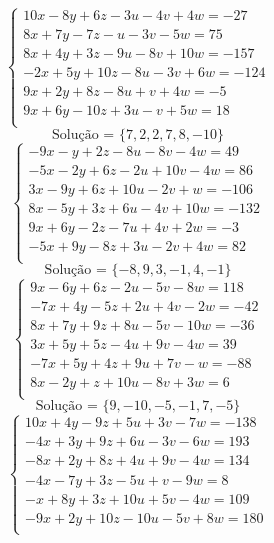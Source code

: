 \documentclass[12pt,oneside,a4paper]{article}
\begin{document}
\vspace{\baselineskip}
\begin{equation*}
\begin{cases}
10x-8y+6z-3u-4v+4w=-27 \\
8x+7y-7z-u-3v-5w=75 \\
8x+4y+3z-9u-8v+10w=-157 \\
-2x+5y+10z-8u-3v+6w=-124 \\
9x+2y+8z-8u+v+4w=-5 \\
9x+6y-10z+3u-v+5w=18 \\
\end{cases}
\end{equation*}
\begin{equation*}
\text{Solução = }\{7,2,2,7,8,-10\}
\end{equation*}
\vspace{\baselineskip}
\begin{equation*}
\begin{cases}
-9x-y+2z-8u-8v-4w=49 \\
-5x-2y+6z-2u+10v-4w=86 \\
3x-9y+6z+10u-2v+w=-106 \\
8x-5y+3z+6u-4v+10w=-132 \\
9x+6y-2z-7u+4v+2w=-3 \\
-5x+9y-8z+3u-2v+4w=82 \\
\end{cases}
\end{equation*}
\begin{equation*}
\text{Solução = }\{-8,9,3,-1,4,-1\}
\end{equation*}
\vspace{\baselineskip}
\begin{equation*}
\begin{cases}
9x-6y+6z-2u-5v-8w=118 \\
-7x+4y-5z+2u+4v-2w=-42 \\
8x+7y+9z+8u-5v-10w=-36 \\
3x+5y+5z-4u+9v-4w=39 \\
-7x+5y+4z+9u+7v-w=-88 \\
8x-2y+z+10u-8v+3w=6 \\
\end{cases}
\end{equation*}
\begin{equation*}
\text{Solução = }\{9,-10,-5,-1,7,-5\}
\end{equation*}
\vspace{\baselineskip}
\begin{equation*}
\begin{cases}
10x+4y-9z+5u+3v-7w=-138 \\
-4x+3y+9z+6u-3v-6w=193 \\
-8x+2y+8z+4u+9v-4w=134 \\
-4x-7y+3z-5u+v-9w=8 \\
-x+8y+3z+10u+5v-4w=109 \\
-9x+2y+10z-10u-5v+8w=180 \\
\end{cases}
\end{equation*}
\end{document}
